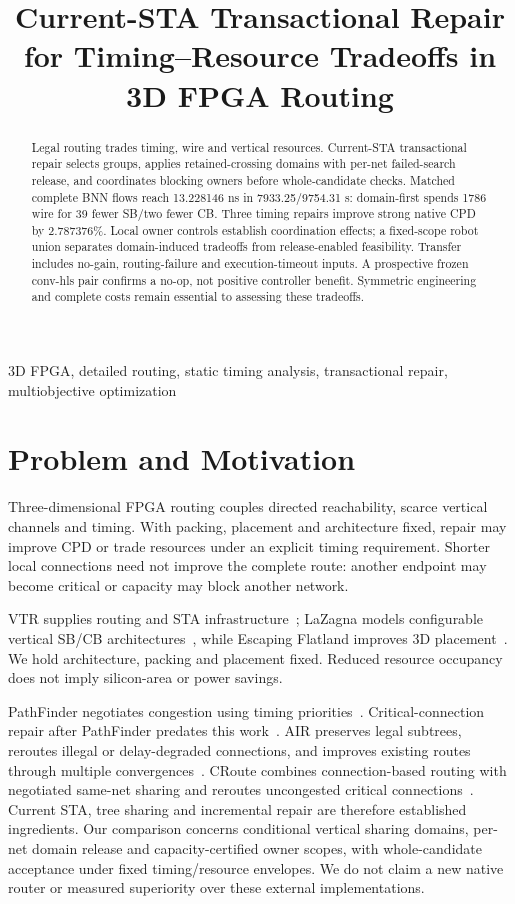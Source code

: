\documentclass[conference,10pt]{IEEEtran}
\title{Current-STA Transactional Repair for Timing--Resource Tradeoffs in 3D FPGA Routing}
\author{\IEEEauthorblockN{Anonymous development manuscript}}
\begin{document}
\maketitle
\begin{abstract}
Legal routing trades timing, wire and vertical resources. Current-STA transactional repair selects groups, applies retained-crossing domains with per-net failed-search release, and coordinates blocking owners before whole-candidate checks. Matched complete BNN flows reach 13.228146 ns in 7933.25/9754.31 s: domain-first spends 1786 wire for 39 fewer SB/two fewer CB. Three timing repairs improve strong native CPD by 2.787376\%. Local owner controls establish coordination effects; a fixed-scope robot union separates domain-induced tradeoffs from release-enabled feasibility. Transfer includes no-gain, routing-failure and execution-timeout inputs. A prospective frozen conv-hls pair confirms a no-op, not positive controller benefit. Symmetric engineering and complete costs remain essential to assessing these tradeoffs.
\end{abstract}
\begin{IEEEkeywords}
3D FPGA, detailed routing, static timing analysis, transactional repair, multiobjective optimization
\end{IEEEkeywords}

\section{Problem and Motivation}
Three-dimensional FPGA routing couples directed reachability, scarce vertical channels and timing. With packing, placement and architecture fixed, repair may improve CPD or trade resources under an explicit timing requirement. Shorter local connections need not improve the complete route: another endpoint may become critical or capacity may block another network.

VTR supplies routing and STA infrastructure~\cite{vtr9paper}; LaZagna models configurable vertical SB/CB architectures~\cite{lazagna}, while Escaping Flatland improves 3D placement~\cite{flatland}. We hold architecture, packing and placement fixed. Reduced resource occupancy does not imply silicon-area or power savings.

PathFinder negotiates congestion using timing priorities~\cite{pathfinder}. Critical-connection repair after PathFinder predates this work~\cite{liurepair}. AIR preserves legal subtrees, reroutes illegal or delay-degraded connections, and improves existing routes through multiple convergences~\cite{air}. CRoute combines connection-based routing with negotiated same-net sharing and reroutes uncongested critical connections~\cite{croute}. Current STA, tree sharing and incremental repair are therefore established ingredients. Our comparison concerns conditional vertical sharing domains, per-net domain release and capacity-certified owner scopes, with whole-candidate acceptance under fixed timing/resource envelopes. We do not claim a new native router or measured superiority over these external implementations.
\end{document}
